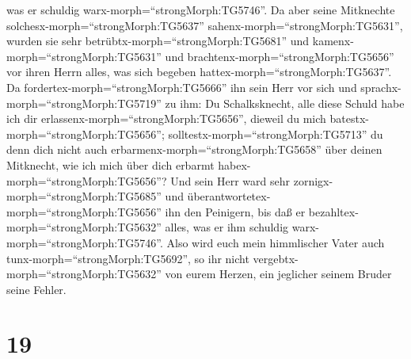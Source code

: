 was er schuldig warx-morph=``strongMorph:TG5746''.  Da aber
seine Mitknechte solchesx-morph=``strongMorph:TG5637''
sahenx-morph=``strongMorph:TG5631'', wurden sie sehr
betrübtx-morph=``strongMorph:TG5681'' und
kamenx-morph=``strongMorph:TG5631'' und
brachtenx-morph=``strongMorph:TG5656'' vor ihren Herrn alles, was sich
begeben hattex-morph=``strongMorph:TG5637''.  Da
fordertex-morph=``strongMorph:TG5666'' ihn sein Herr vor sich und
sprachx-morph=``strongMorph:TG5719'' zu ihm: Du Schalksknecht, alle
diese Schuld habe ich dir erlassenx-morph=``strongMorph:TG5656'',
dieweil du mich batestx-morph=``strongMorph:TG5656''; 
solltestx-morph=``strongMorph:TG5713'' du denn dich nicht auch
erbarmenx-morph=``strongMorph:TG5658'' über deinen Mitknecht, wie ich
mich über dich erbarmt habex-morph=``strongMorph:TG5656''? 
Und sein Herr ward sehr zornigx-morph=``strongMorph:TG5685'' und
überantwortetex-morph=``strongMorph:TG5656'' ihn den Peinigern, bis daß
er bezahltex-morph=``strongMorph:TG5632'' alles, was er ihm schuldig
warx-morph=``strongMorph:TG5746''.  Also wird euch mein
himmlischer Vater auch tunx-morph=``strongMorph:TG5692'', so ihr nicht
vergebtx-morph=``strongMorph:TG5632'' von eurem Herzen, ein jeglicher
seinem Bruder seine Fehler.

\hypertarget{section-18}{%
\section{19}\label{section-18}}

